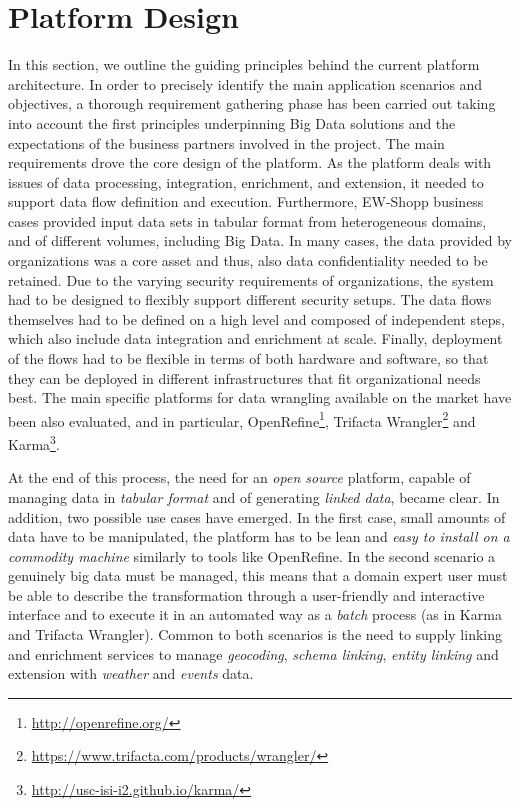 \section{Platform Design}\label{sec:approach}

In this section, we outline the guiding principles behind the current platform architecture. 
In order to precisely identify the main application scenarios and objectives, a thorough requirement gathering phase has been carried out taking into account the first principles underpinning Big Data solutions and the expectations of the business partners involved in the project. The main requirements drove the core design of the platform. As the platform deals with issues of data processing, integration, enrichment, and extension, it needed to support data flow definition and execution. 
Furthermore, EW-Shopp business cases provided input data sets in tabular format from heterogeneous domains, and of different volumes, including Big Data. In many cases, the data provided by organizations was a core asset and thus, also data confidentiality needed to be retained. 
Due to the varying security requirements of organizations, the system had to be designed to flexibly support different security setups. The data flows themselves had to be defined on a high level and composed of independent steps, which also include data integration and enrichment at scale. Finally, deployment of the flows had to be flexible in terms of both hardware and software, so that they can be deployed in different infrastructures that fit organizational needs best.
The main specific platforms for data wrangling available on the market have been also evaluated, and in particular, OpenRefine\footnote{\url{http://openrefine.org/}}, Trifacta Wrangler\footnote{\url{https://www.trifacta.com/products/wrangler/}} and Karma\footnote{\url{http://usc-isi-i2.github.io/karma/}}. 

At the end of this process, the need for an \textit{open source} platform, capable of managing data in \textit{tabular format} and of generating \textit{linked data}, became clear. 
In addition, two possible use cases have emerged. In the first case, small amounts of data have to be manipulated, the platform has to be lean and \textit{easy to install on a commodity machine} similarly to tools like OpenRefine. In the second scenario a genuinely big data must be managed, this means that a domain expert user must be able to describe the transformation through a user-friendly and interactive interface and to execute it in an automated way as a \textit{batch} process (as in Karma and Trifacta Wrangler). 
Common to both scenarios is the need to supply linking and enrichment services to manage \textit{geocoding}, \textit{schema linking}, \textit{entity linking} and extension with \textit{weather} and \textit{events} data. 

